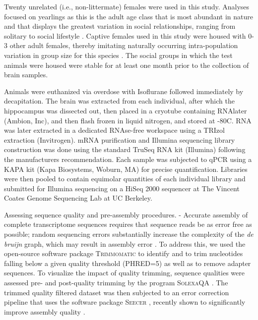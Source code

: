 \documentclass[10.5pt]{article}
\begin{document}
Twenty unrelated (i.e., non-littermate) females were used in this study. Analyses focused on yearlings as this is the adult age class that is most abundant in nature and that displays the greatest variation in social relationships, ranging from solitary to social lifestyle \citep{Lacey:2004ga}.  Captive females used in this study were housed with 0-3 other adult females, thereby imitating naturally occurring intra-population variation in group size for this species \citep{Lacey:2004ga}. The social groups in which the test animals were housed were stable for at least one month prior to the collection of brain samples.  

Animals were euthanized via overdose with Isoflurane followed immediately by decapitation. The brain was extracted from each individual, after which the hippocampus was dissected out, then placed in a cryotube containing RNAlater (Ambion, Inc), and then flash frozen in liquid nitrogen, and stored at -80C.  RNA was later extracted in a dedicated RNAse-free workspace using a TRIzol extraction (Invitrogen).  mRNA purification and Illumina sequencing library construction was done using the standard TruSeq RNA kit (Illumina) following the manufacturers recommendation.  Each sample was subjected to qPCR using a KAPA kit (Kapa Biosystems, Woburn, MA) for precise quantification. Libraries were then pooled to contain equimolar quantities of each individual library and submitted for Illumina sequencing on a HiSeq 2000 sequencer at The Vincent Coates Genome Sequencing Lab at UC Berkeley.

Assessing sequence quality and pre-assembly procedures. - Accurate assembly of complete transcriptome sequences requires that sequence reads be as error free as possible; random sequencing errors substantially increase the complexity of the \textit{de bruijn} graph, which may result in assembly error \citep{Flicek:2009dl, Miller:2010gx}.   To address this, we used the open-source software package \textsc{Trimmomatic} \citep{Lohse:2012fg} to identify and to trim nucleotides falling below a given quality threshold (PHRED=5) as well as to remove adapter sequences.  To visualize the impact of quality trimming, sequence qualities were assessed pre- and post-quality trimming by the program \textsc{SolexaQA} \citep{Cox:2010ch}. The trimmed quality filtered dataset was then subjected to an error correction pipeline that uses the software package \textsc{Seecer} \citep{Le:2013dy}, recently shown to significantly improve assembly quality \citep{MacManes:2013tv}.  
\end{document}
